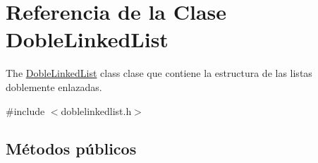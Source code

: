 \hypertarget{class_doble_linked_list}{}\section{Referencia de la Clase Doble\+Linked\+List}
\label{class_doble_linked_list}


The \mbox{\hyperlink{class_doble_linked_list}{Doble\+Linked\+List}} class clase que contiene la estructura de las listas doblemente enlazadas.  




{\ttfamily \#include $<$doblelinkedlist.\+h$>$}

\subsection*{Métodos públicos}
